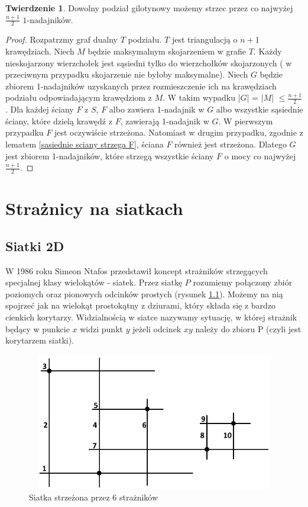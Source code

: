 \documentclass[brudnopis]{xmgr}
\theoremstyle{definition}
\newtheorem{Twierdzenie}{Twierdzenie}
\begin{document}
\begin{Twierdzenie} \cite{knadajniki}
  Dowolny podział gilotynowy możemy strzec przez co najwyżej $\frac{n+1}{2}$ $1$-nadajników.
\end{Twierdzenie}
\begin{proof}
	Rozpatrzmy graf dualny $T$ podziału. $T$ jest triangulacją o $n + 1$ krawędziach. Niech $M$ będzie maksymalnym skojarzeniem w grafie $T$. Każdy nieskojarzony wierzchołek jest sąsiedni tylko do wierzchołków skojarzonych ( w przeciwnym przypadku skojarzenie nie byłoby maksymalne). Niech $G$ będzie zbiorem 1-nadajników uzyskanych przez rozmieszczenie ich na krawędziach podziału odpowiadającym krawędziom z $M$. W takim wypadku |$G$| = |$M$| $\le \frac{n+1}{2}$. Dla każdej ściany $F$ z $S$, $F$ albo zawiera 1-nadajnik w $G$ albo wszystkie sąsiednie ściany, które dzielą krawędź z $F$, zawierają 1-nadajnik w $G$. W pierwszym przypadku $F$ jest oczywiście strzeżona. Natomiast w drugim przypadku, zgodnie z lematem \ref{sasiednie sciany strzega F}, ściana $F$ również jest strzeżona. Dlatego $G$ jest zbiorem 1-nadajników, które strzegą wszystkie ściany $F$ o mocy co najwyżej $\frac{n+1}{2}$.
\end{proof}


\chapter{Strażnicy na siatkach}
\section{Siatki 2D}
W 1986 roku Simeon Ntafos przedstawił koncept strażników strzegących specjalnej klasy wielokątów - siatek.
Przez siatkę $P$ rozumiemy połączony zbiór poziomych oraz pionowych odcinków prostych (rysunek \ref{fig:siatka 2d}). Możemy na nią spojrzeć jak na wielokąt prostokątny z dziurami, który składa się z bardzo cienkich korytarzy.
Widzialnością w siatce nazywamy sytuację, w której strażnik będący w punkcie $x$ widzi punkt $y$ jeżeli odcinek $xy$ należy do zbioru P (czyli jest korytarzem siatki).
 \begin{figure}[ht!]
   \centering
   \includegraphics[width=14cm,height=6cm]{rysunki/przykladowa_siatka.png}
   \caption{Siatka strzeżona przez 6 strażników}
   \label{fig:siatka 2d}
 \end{figure} 
\end{document}
